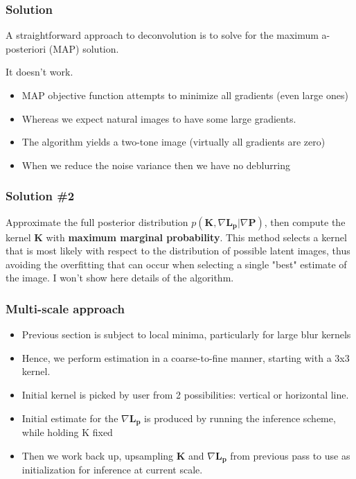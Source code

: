 \documentclass{beamer}
\begin{document}
\begin{frame}
    \frametitle{Solution}
    A straightforward approach to deconvolution is to solve for the maximum a-posteriori (MAP) solution.\\
    \pause
    \begin{center}
    {\huge It doesn't work.}\\
\end{center}
    \pause
    \begin{itemize}
        \item MAP objective function attempts to minimize all gradients (even large ones)
        \item Whereas we expect natural images to have some large gradients.
        \item The algorithm yields a two-tone image (virtually all gradients are zero)
        \item When we reduce the noise variance then we have no deblurring
    \end{itemize}
\end{frame}
\begin{frame}
    \frametitle{Solution \#2}
    Approximate the full posterior distribution $p(\boldsymbol{K}, \nabla\boldsymbol{L_p}|\nabla\boldsymbol{P})$, then compute the kernel $\boldsymbol{K}$ with \textbf{maximum marginal probability}.
    This method selects a kernel that is most likely with respect to the
    distribution of possible latent images, thus avoiding the overfitting that can occur when selecting a
single "best" estimate of the image. I won't show here details of the algorithm.
\end{frame}
\begin{frame}
    \frametitle{Multi-scale approach}
    \begin{itemize}
            \item Previous section is subject to local minima, particularly for large blur kernels
            \item Hence, we perform estimation in a coarse-to-fine manner,
                starting with a 3x3 kernel.
            \item Initial kernel is picked by user from 2 possibilities: vertical or horizontal line.
            \item Initial estimate for the $\nabla\boldsymbol{L_p}$ is produced by running the inference scheme, while holding K fixed
            \item Then we work back up, upsampling $\boldsymbol{K}$ and $\nabla\boldsymbol{L_p}$ from previous pass to use as initialization for inference at current scale.
    \end{itemize}
\end{frame}
\end{document}
